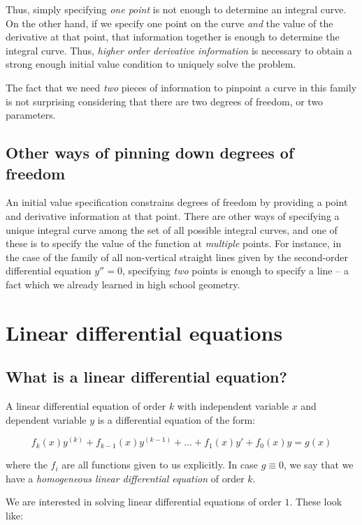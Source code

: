 \documentclass{amsart}
\begin{document}
Thus, simply specifying {\em one point} is not enough to determine an
integral curve. On the other hand, if we specify one point on the
curve {\em and} the value of the derivative at that point, that
information together is enough to determine the integral curve. Thus,
{\em higher order derivative information} is necessary to obtain a
strong enough initial value condition to uniquely solve the problem.

The fact that we need {\em two} pieces of information to pinpoint a
curve in this family is not surprising considering that there are two
degrees of freedom, or two parameters.

\subsection{Other ways of pinning down degrees of freedom}

An initial value specification constrains degrees of freedom by
providing a point and derivative information at that point. There are
other ways of specifying a unique integral curve among the set of all
possible integral curves, and one of these is to specify the value of
the function at {\em multiple} points. For instance, in the case of
the family of all non-vertical straight lines given by the
second-order differential equation $y'' = 0$, specifying {\em two}
points is enough to specify a line -- a fact which we already learned
in high school geometry.

\section{Linear differential equations}

\subsection{What is a linear differential equation?}

A linear differential equation of order $k$ with independent variable
$x$ and dependent variable $y$ is a differential equation of the form:

$$f_k(x)y^{(k)} + f_{k-1}(x)y^{(k-1)} + \dots + f_1(x)y' + f_0(x)y = g(x)$$

where the $f_i$ are all functions given to us explicitly. In case $g
\equiv 0$, we say that we have a {\em homogeneous linear differential
equation} of order $k$.

We are interested in solving linear differential equations of order
$1$. These look like:
\end{document}
